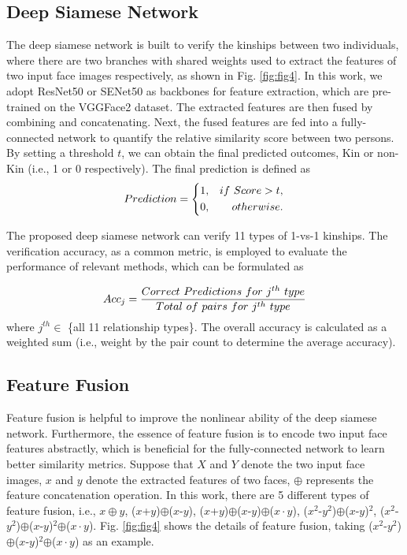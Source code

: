 \documentclass[a4paper, 10pt, conference]{ieeeconf}      %
\begin{document}
\subsection{Deep Siamese Network}

The deep siamese network is built to verify the kinships between two individuals, where there are two branches with shared weights used to extract the features of two input face images respectively, as shown in Fig. \ref{fig:fig4}. In this work, we adopt ResNet50 \cite{c20} or SENet50 \cite{c21} as backbones for feature extraction, which are pre-trained on the VGGFace2 \cite{c17} dataset. The extracted features are then fused by combining and concatenating. Next, the fused features are fed into a fully-connected network to quantify the relative similarity score between two persons. By setting a threshold $t$, we can obtain the final predicted outcomes, Kin or non-Kin (i.e., 1 or 0 respectively). The final prediction is defined as
\begin{equation}
\setlength{\abovedisplayskip}{0.2cm}
\setlength{\belowdisplayskip}{0.2cm}
Prediction=\left\{
\begin{aligned}
1 & , & if\ Score>t, \\
0 & , & otherwise.
\end{aligned}
\right.
\label{eq:eq1}
\end{equation}

The proposed deep siamese network can verify 11 types of 1-vs-1 kinships. The verification accuracy, as a common metric, is employed to evaluate the performance of relevant methods, which can be formulated as

\begin{equation}
\setlength{\abovedisplayskip}{0.2cm}
\setlength{\belowdisplayskip}{0.2cm}
{Acc_j} = \frac {Correct\ Predictions\ for\ j^{th}\ type} {Total\ of\ pairs\ for\ j^{th}\ type}
\end{equation}
where $j^{th} \in$ \{all 11 relationship types\}. The overall accuracy is calculated as a weighted sum (i.e., weight by the pair count to determine the average accuracy).

\subsection{Feature Fusion}

Feature fusion is helpful to improve the nonlinear ability of the deep siamese network. Furthermore, the essence of feature fusion is to encode two input face features abstractly, which is beneficial for the fully-connected network to learn better similarity metrics. Suppose that $X$ and $Y$ denote the two input face images, $x$ and $y$ denote the extracted features of two faces, $\oplus$ represents the feature concatenation operation. In this work, there are 5  different types of feature fusion, i.e., $x \oplus y$, ($x$+$y$)$\oplus$($x$-$y$), ($x$+$y$)$\oplus$($x$-$y$)$\oplus$($x\cdot y$), ($x^2$-$y^2$)$\oplus$($x$-$y$)$^2$, ($x^2$-$y^2$)$\oplus$($x$-$y$)$^2$$\oplus$($x\cdot y$). Fig. \ref{fig:fig4} shows the details of feature fusion, taking ($x^2$-$y^2$)$\oplus$($x$-$y$)$^2$$\oplus$($x\cdot y$) as an example.
\end{document}
